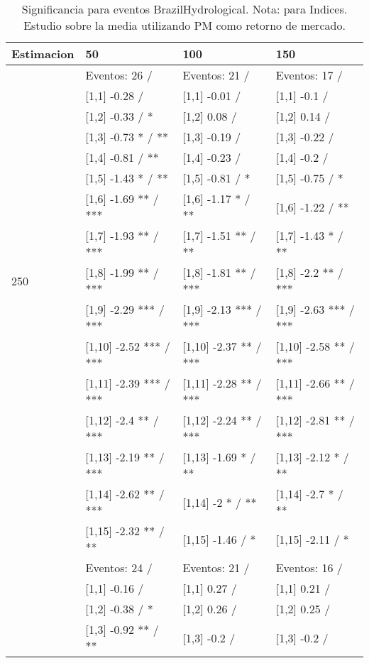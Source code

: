 \begin{table}

\caption{Significancia para eventos BrazilHydrological. Nota: para Indices. Estudio sobre la media utilizando PM como retorno de mercado.}
\centering
\begin{tabular}[t]{llll}
\toprule
Estimacion & 50 & 100 & 150\\
\midrule
 & Eventos:  26 / & Eventos:  21 / & Eventos:  17 /\\
 & {}[1,1] -0.28  / & {}[1,1] -0.01  / & {}[1,1] -0.1  /\\
 & {}[1,2] -0.33  / * & {}[1,2] 0.08  / & {}[1,2] 0.14  /\\
 & {}[1,3] -0.73 * / ** & {}[1,3] -0.19  / & {}[1,3] -0.22  /\\
 & {}[1,4] -0.81  / ** & {}[1,4] -0.23  / & {}[1,4] -0.2  /\\
\addlinespace
 & {}[1,5] -1.43 * / ** & {}[1,5] -0.81  / * & {}[1,5] -0.75  / *\\
 & {}[1,6] -1.69 ** / *** & {}[1,6] -1.17 * / ** & {}[1,6] -1.22  / **\\
 & {}[1,7] -1.93 ** / *** & {}[1,7] -1.51 ** / ** & {}[1,7] -1.43 * / **\\
250 & {}[1,8] -1.99 ** / *** & {}[1,8] -1.81 ** / *** & {}[1,8] -2.2 ** / ***\\
 & {}[1,9] -2.29 *** / *** & {}[1,9] -2.13 *** / *** & {}[1,9] -2.63 *** / ***\\
\addlinespace
 & {}[1,10] -2.52 *** / *** & {}[1,10] -2.37 ** / *** & {}[1,10] -2.58 ** / ***\\
 & {}[1,11] -2.39 *** / *** & {}[1,11] -2.28 ** / *** & {}[1,11] -2.66 ** / ***\\
 & {}[1,12] -2.4 ** / *** & {}[1,12] -2.24 ** / *** & {}[1,12] -2.81 ** / ***\\
 & {}[1,13] -2.19 ** / *** & {}[1,13] -1.69 * / ** & {}[1,13] -2.12 * / **\\
 & {}[1,14] -2.62 ** / *** & {}[1,14] -2 * / ** & {}[1,14] -2.7 * / **\\
\addlinespace
 & {}[1,15] -2.32 ** / ** & {}[1,15] -1.46  / * & {}[1,15] -2.11  / *\\
 & Eventos:  24 / & Eventos:  21 / & Eventos:  16 /\\
 & {}[1,1] -0.16  / & {}[1,1] 0.27  / & {}[1,1] 0.21  /\\
 & {}[1,2] -0.38  / * & {}[1,2] 0.26  / & {}[1,2] 0.25  /\\
 & {}[1,3] -0.92 ** / ** & {}[1,3] -0.2  / & {}[1,3] -0.2  /\\

\end{tabular}
\end{table}
